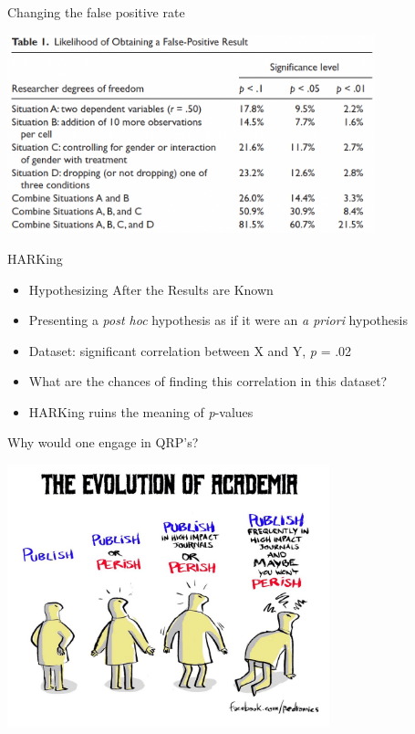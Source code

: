 \documentclass[
  ignorenonframetext,
  aspectratio=169,
]{beamer}
\providecommand{\tightlist}{%
  \setlength{\itemsep}{0pt}\setlength{\parskip}{0pt}}\usepackage{longtable,booktabs,array}
\begin{document}
\begin{frame}{Changing the false positive rate}
\label{changing-the-false-positive-rate}
\begin{center}
\includegraphics[width=0.8\textwidth,height=\textheight]{figs/p-Hacking-table.png}
\end{center}
\end{frame}

\begin{frame}{HARKing}
\label{harking}
\begin{itemize}[<+->]
\tightlist
\item
  Hypothesizing After the Results are Known
\item
  Presenting a \emph{post hoc} hypothesis as if it were an \emph{a
  priori} hypothesis
\item
  Dataset: significant correlation between X and Y, \emph{p} = .02
\item
  What are the chances of finding this correlation in this dataset?
\item
  HARKing ruins the meaning of \emph{p}-values
\end{itemize}
\end{frame}

\begin{frame}{Why would one engage in QRP's?}
\label{why-would-one-engage-in-qrps}
\begin{center}
\includegraphics[width=0.7\textwidth,height=\textheight]{figs/pub-per.jpeg}
\end{center}
\end{frame}
\end{document}
